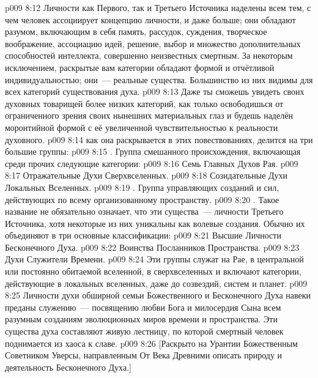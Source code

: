 \vs p009 8:12 Личности как Первого, так и Третьего Источника наделены всем тем, с чем человек ассоциирует концепцию личности, и даже больше; они обладают разумом, включающим в себя память, рассудок, суждения, творческое воображение, ассоциацию идей, решение, выбор и множество дополнительных способностей интеллекта, совершенно неизвестных смертным. За некоторым исключением, раскрытые вам категории обладают формой и отчётливой индивидуальностью; они~--- реальные существа. Большинство из них видимы для всех категорий существования духа.
\vs p009 8:13 Даже ты сможешь увидеть своих духовных товарищей более низких категорий, как только освободишься от ограниченного зрения своих нынешних материальных глаз и будешь наделён моронтийной формой с её увеличенной чувствительностью к реальности духовного.
\vs p009 8:14 \pc {} как она раскрывается в этих повествованиях, делится на три большие группы:
\vs p009 8:15 . Группа смешанного происхождения, включающая среди прочих следующие категории:
\vs p009 8:16 Семь Главных Духов Рая.
\vs p009 8:17 Отражательные Духи Сверхвселенных.
\vs p009 8:18 Созидательные Духи Локальных Вселенных.
\vs p009 8:19 . Группа управляющих созданий и сил, действующих по всему организованному пространству.
\vs p009 8:20 . Такое название не обязательно означает, что эти существа~--- личности Третьего Источника, хотя некоторые из них уникальны как волевые создания. Обычно их объединяют в три основные классификации:
\vs p009 8:21 Высшие Личности Бесконечного Духа.
\vs p009 8:22 Воинства Посланников Пространства.
\vs p009 8:23 Духи Служители Времени.
\vs p009 8:24 Эти группы служат на Рае, в центральной или постоянно обитаемой вселенной, в сверхвселенных и включают категории, действующие в локальных вселенных, даже до созвездий, систем и планет.
\vs p009 8:25 Личности духи обширной семьи Божественного и Бесконечного Духа навеки преданы служению~--- посвящению любви Бога и милосердия Сына всем разумным созданиям эволюционных миров времени и пространства. Эти существа духа составляют живую лестницу, по которой смертный человек поднимается из хаоса к славе.
\vsetoff
\vs p009 8:26 [Раскрыто на Урантии Божественным Советником Уверсы, направленным От Века Древними описать природу и деятельность Бесконечного Духа.]
\quizlink
